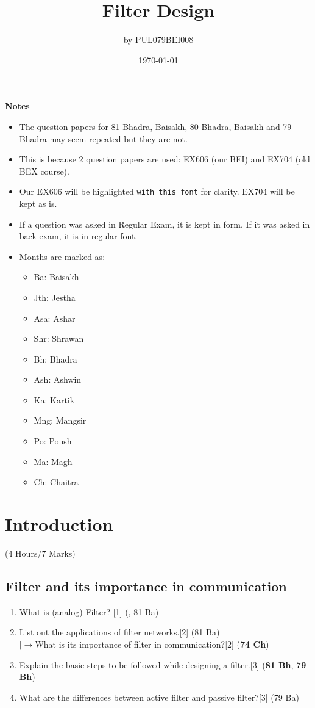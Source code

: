 \documentclass[12pt]{article}
\title{Filter Design}
\author{by PUL079BEI008}
\date{\today}
\newcommand{\lb}{\\$\left|\rightarrow\right.$}
\begin{document}
\maketitle
\vspace{8cm}
\textbf{Notes}
\begin{itemize}
	\item The question papers for 81 Bhadra, Baisakh, 80 Bhadra, Baisakh and 79 Bhadra may seem repeated but they are not.
	\item This is because 2 question papers are used: EX606 (our BEI) and EX704 (old BEX course).
	\item Our EX606 will be highlighted \texttt{with this font} for clarity. EX704 will be kept as is.
	\item If a question was asked in Regular Exam, it is kept in  form. If it was asked in back exam, it is in regular font.
	\item Months are marked as: 
	\begin{itemize}[noitemsep, topsep=0pt]
		\item Ba: Baisakh
		\item Jth: Jestha
		\item Asa: Ashar
		\item Shr: Shrawan
		\item Bh: Bhadra
		\item Ash: Ashwin
		\item Ka: Kartik
		\item Mng: Mangsir
		\item Po: Poush
		\item Ma: Magh
		\item Ch: Chaitra
	\end{itemize}
\end{itemize}
\pagebreak
\tableofcontents
\pagebreak

\section{Introduction}
	\begin{center}(4 Hours/7 Marks)\end{center}
	\subsection{Filter and its importance in communication}
		\begin{enumerate}
			\item What is (analog) Filter? \hfill [1] (, 81 Ba)
			\item List out the applications of filter networks.\hfill[2] (81 Ba)
			\lb What is its importance of filter in communication?\hfill[2] (\textbf{74 Ch})
			\item Explain the basic steps to be followed while designing a filter.\hfill[3] (\textbf{81 Bh}, \textbf{79 Bh})
			\item What are the differences between active filter and passive filter?\hfill[3] (79 Ba)
		\end{enumerate}
		
\end{document}
